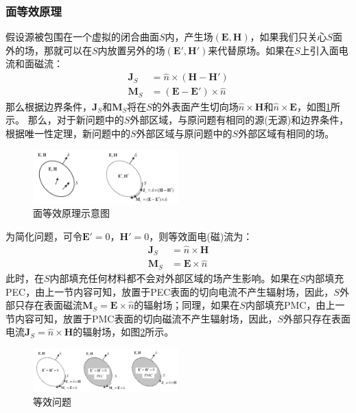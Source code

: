 \documentclass{article}
\numberwithin{equation}{section}
\begin{document}
\subsubsection{面等效原理}
假设源被包围在一个虚拟的闭合曲面$S$内，产生场$(\mathbf{E},\mathbf{H})$，如果我们只关心$S$面外的场，那就可以在$S$内放置另外的场$(\mathbf{E}',\mathbf{H}')$来代替原场。如果在$S$上引入面电流和面磁流：
\begin{align}
    \label{eq:eq214}
    \mathbf{J}_S&=\hat{n}\times(\mathbf{H}-\mathbf{H}') \\
    \label{eq:eq215}
    \mathbf{M}_S&=(\mathbf{E}-\mathbf{E}')\times\hat{n}
\end{align}
那么根据边界条件，$\mathbf{J}_S$和$\mathbf{M}_S$将在$S$的外表面产生切向场$\hat{n}\times\mathbf{H}$和$\hat{n}\times\mathbf{E}$，如图\ref{fig:fig14}所示。
那么，对于新问题中的$S$外部区域，与原问题有相同的源(无源)和边界条件，根据唯一性定理，新问题中的$S$外部区域与原问题中的$S$外部区域有相同的场。
\begin{figure}[ht]
    \centering
    \includegraphics[width=0.5\textwidth]{面等效原理示意图.PNG}
    \caption{面等效原理示意图}
    \label{fig:fig14}
\end{figure}
\par
为简化问题，可令$\mathbf{E}'=0$，$\mathbf{H}'=0$，则等效面电(磁)流为：
\begin{align}
    \label{eq:eq216}
    \mathbf{J}_S&=\hat{n}\times\mathbf{H} \\
    \label{eq:eq217}
    \mathbf{M}_S&=\mathbf{E}\times\hat{n}
\end{align}
此时，在$S$内部填充任何材料都不会对外部区域的场产生影响。如果在$S$内部填充PEC，由上一节内容可知，放置于PEC表面的切向电流不产生辐射场，因此，$S$外部只存在表面磁流$\mathbf{M}_S=\mathbf{E}\times\hat{n}$的辐射场；同理，如果在$S$内部填充PMC，由上一节内容可知，放置于PMC表面的切向磁流不产生辐射场，因此，$S$外部只存在表面电流$\mathbf{J}_S=\hat{n}\times\mathbf{H}$的辐射场，如图\ref{fig:fig28}所示。
\begin{figure}[ht]
    \centering
    \includegraphics[width=0.5\textwidth]{等效问题.PNG}
    \caption{等效问题}
    \label{fig:fig28}
\end{figure}
\end{document}
